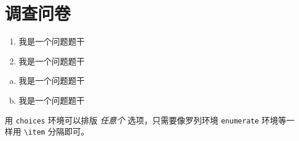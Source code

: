 
\appendix


\chapter{调查问卷}

\begin{enumerate}
  \item 我是一个问题题干
  \item 我是一个问题题干
\end{enumerate}

\begin{enumerate}[(a)]
  \item 我是一个问题题干
  \item 我是一个问题题干
\end{enumerate}

用 \verb|choices| 环境可以排版 \emph{任意个} 选项，只需要像罗列环境 \verb|enumerate| 环境等一样用 \verb|\item| 分隔即可。

